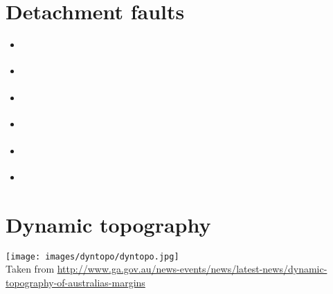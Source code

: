 \section{Detachment faults} 

\begin{scriptsize}
\begin{itemize}
\item[\twothousandseven]     
\textcite{werr07} 
\item[\twothousandten]       
\textcite{jaml10} 
\item[\twothousandeleven]    
\textcite{rera11} 
\item[\twothousandfifteen]   
\textcite{matv15} 
\item[\twothousandnineteen]  
\textcite{gubg19} 
\item[\twothousandtwentyone] 
\textcite{sabg21} 
\end{itemize}
\end{scriptsize}

\section{Dynamic topography} 

\begin{center}
\texttt{[image: images/dyntopo/dyntopo.jpg]}\\
{\captionfont Taken from \url{http://www.ga.gov.au/news-events/news/latest-news/dynamic-topography-of-australias-margins}}
\end{center}

